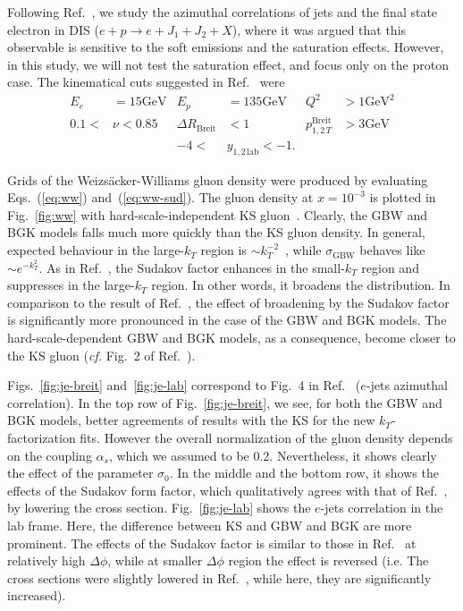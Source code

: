 \documentclass[12pt]{article}
\numberwithin{equation}{section}
\numberwithin{table}{section}
\numberwithin{figure}{section}
\newcommand{\GeV}[0]{\mathrm{GeV}}
\newcommand{\comment}[1]{\texttt{\color{red}#1}}
\begin{document}
Following Ref.~\cite{vanHameren:2021sqc}, we study the azimuthal correlations of jets and the final state electron in DIS ($e+p\rightarrow e+J_1+J_2+X$), where it was argued that this observable is sensitive to the soft emissions and the saturation effects. However, in this study, we will not test the saturation effect, and focus only on the proton case.
The kinematical cuts suggested in Ref.~\cite{vanHameren:2021sqc} were
\begin{align*}
	E_e&=15\GeV& E_p&=135\GeV& Q^2&>1\GeV^2\\
	0.1<&\nu<0.85&\Delta R_{\mathrm{Breit}}&<1&p^{\mathrm{Breit}}_{1,2\,T}&>3\GeV\\
	&&-4<&y_{1,2\,\mathrm{lab}}<-1.&&
\end{align*}

Grids of the Weizs\"acker-Williams gluon density were produced by evaluating Eqs.~(\ref{eq:ww}) and~(\ref{eq:ww-sud}).
The gluon density at $x=10^{-3}$ is plotted in Fig.~\ref{fig:ww} with hard-scale-independent KS gluon~\cite{vanHameren:2021sqc,Abdulov:2021ivr}. Clearly, the GBW and BGK models falls much more quickly than the KS gluon density. In general, expected behaviour in the large-$k_T$ region is $\sim k_T^{-2}$~\cite{Dominguez:2010xd,Dominguez:2011wm}, while $\sigma_{\mathrm{GBW}}$ behaves like $\sim e^{-k_T^2}$.
As in Ref.~\cite{vanHameren:2021sqc}, the Sudakov factor enhances in the small-$k_T$ region and suppresses in the large-$k_T$ region. In other words, it broadens the distribution. In comparison to the result of Ref.~\cite{vanHameren:2021sqc}, the effect of broadening by the Sudakov factor is significantly more pronounced in the case of the GBW and BGK models. The hard-scale-dependent GBW and BGK models, as a consequence, become closer to the KS gluon (\textit{cf.} Fig.~2 of Ref.~\cite{vanHameren:2021sqc}).  

Figs.~\ref{fig:je-breit} and~\ref{fig:je-lab} correspond to Fig.~4 in Ref.~\cite{vanHameren:2021sqc} ($e$-jets azimuthal correlation). 
In the top row of Fig.~\ref{fig:je-breit}, we see, for both the GBW and BGK models, better agreements of results with the KS for the new $k_T$-factorization fits. However the overall normalization of the gluon density depends on the coupling $\alpha_s$, which we assumed to be 0.2. Nevertheless, it shows clearly the effect of the parameter $\sigma_0$. In the middle and the bottom row, it shows the effects of the Sudakov form factor, which qualitatively agrees with that of Ref.~\cite{vanHameren:2021sqc}, by lowering the cross section.
Fig.~\ref{fig:je-lab} shows the $e$-jets correlation in the lab frame. Here, the difference between KS and GBW and BGK are more prominent. %
The effects of the Sudakov factor is similar to those in Ref.~\cite{vanHameren:2021sqc} at relatively high $\Delta \phi$, while at smaller $\Delta \phi$ region the effect is reversed (i.e. The cross sections were slightly lowered in Ref.~\cite{vanHameren:2021sqc}, while here, they are significantly increased). \\
\end{document}
